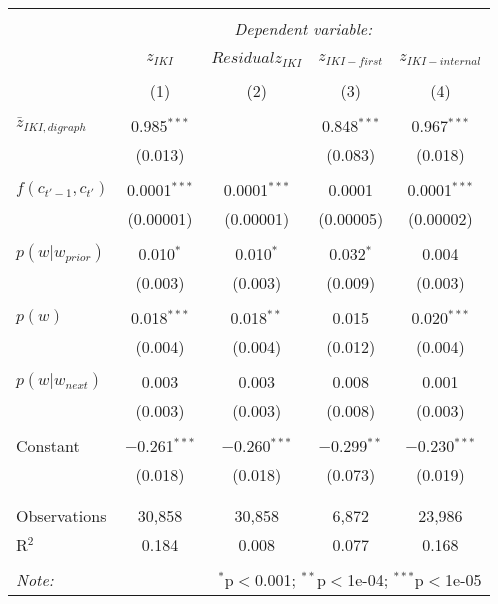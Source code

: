 
\begin{table*}[!htbp] \centering 
  \caption{} 
  \label{} 
\begin{tabular}{@{\extracolsep{5pt}}lcccc} 
\\[-1.8ex]\hline 
\hline \\[-1.8ex] 
 & \multicolumn{4}{c}{\textit{Dependent variable:}} \\ 
\cline{2-5} 
\\[-1.8ex] & $z_{IKI}$ & $Residual z_{IKI}$ & $z_{IKI-first}$ & $z_{IKI-internal}$ \\ 
\\[-1.8ex] & (1) & (2) & (3) & (4)\\ 
\hline \\[-1.8ex] 
 $\bar{z}_{IKI,digraph}$ & 0.985$^{***}$ &  & 0.848$^{***}$ & 0.967$^{***}$ \\ 
  & (0.013) &  & (0.083) & (0.018) \\ 
  & & & & \\ 
 $f(c_{t'-1},c_{t'})$ & 0.0001$^{***}$ & 0.0001$^{***}$ & 0.0001 & 0.0001$^{***}$ \\ 
  & (0.00001) & (0.00001) & (0.00005) & (0.00002) \\ 
  & & & & \\ 
 $p(w|w_{prior})$ & 0.010$^{*}$ & 0.010$^{*}$ & 0.032$^{*}$ & 0.004 \\ 
  & (0.003) & (0.003) & (0.009) & (0.003) \\ 
  & & & & \\ 
 $p(w)$ & 0.018$^{***}$ & 0.018$^{**}$ & 0.015 & 0.020$^{***}$ \\ 
  & (0.004) & (0.004) & (0.012) & (0.004) \\ 
  & & & & \\ 
 $p(w|w_{next})$ & 0.003 & 0.003 & 0.008 & 0.001 \\ 
  & (0.003) & (0.003) & (0.008) & (0.003) \\ 
  & & & & \\ 
 Constant & $-$0.261$^{***}$ & $-$0.260$^{***}$ & $-$0.299$^{**}$ & $-$0.230$^{***}$ \\ 
  & (0.018) & (0.018) & (0.073) & (0.019) \\ 
  & & & & \\ 
\hline \\[-1.8ex] 
Observations & 30,858 & 30,858 & 6,872 & 23,986 \\ 
R$^{2}$ & 0.184 & 0.008 & 0.077 & 0.168 \\ 
\hline 
\hline \\[-1.8ex] 
\textit{Note:}  & \multicolumn{4}{r}{$^{*}$p$<$0.001; $^{**}$p$<$1e-04; $^{***}$p$<$1e-05} \\ 
\end{tabular} 
\end{table*} 
